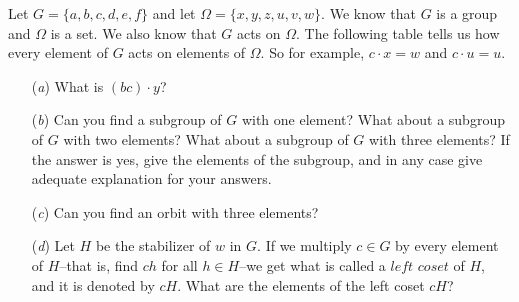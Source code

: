\documentclass[12pt,letterpaper,boxed]{hmcpset}
\begin{document}
\begin{problem}[4.4.10]
Let $G = \{a,b,c,d,e,f\}$ and let $\Omega = \{x,y,z,u,v,w\}$. We know that $G$ is a group and $\Omega$ is a set. We also know that $G$ acts on $\Omega$. The following table tells us how every element of $G$ acts on elements of $\Omega$. 
\vspace{40mm}
So for example, $c \cdot x = w$ and $c \cdot u = u$. 
\begin{itemize}
  \item[(\textit{a})] What is $(bc) \cdot y$?
  
  \item[(\textit{b})] Can you find a subgroup of $G$ with one element? What about a subgroup of $G$ with two elements? What about a subgroup of $G$ with three elements?  If the answer is yes, give the elements of the subgroup, and in any case give adequate explanation for your answers. 
  
  \item[(\textit{c})] Can you find an orbit with three elements?
  
  \item[(\textit{d})] Let $H$ be the stabilizer of $w$ in $G$. If we multiply $c \in G$ by every element of $H$--that is, find $ch$ for all $h \in H$--we get what is called a $\textit{left coset}$ of $H$, and it is denoted by $cH$. What are the elements of the left coset $cH$?
\end{itemize}
\end{problem}

\begin{solution}

\end{solution}
\end{document}
